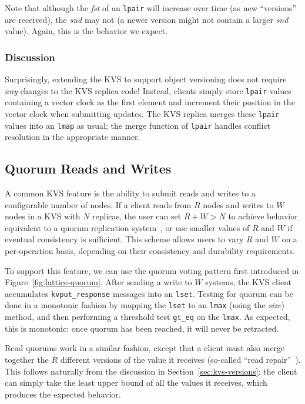 Note that although the \emph{fst} of an \texttt{lpair} will increase over time
(as new ``versions'' are received), the \emph{snd} may not (a newer version
might not contain a larger \emph{snd} value). Again, this is the behavior we
expect.

\subsubsection{Discussion}
Surprisingly, extending the KVS to support object versioning does not require
\emph{any} changes to the KVS replica code! Instead, clients simply store
\texttt{lpair} values containing a vector clock as the first element and
increment their position in the vector clock when submitting updates. The KVS
replica merges these \texttt{lpair} values into an \texttt{lmap} as usual; the
merge function of \texttt{lpair} handles conflict resolution in the appropriate
manner.

\subsection{Quorum Reads and Writes}
A common KVS feature is the ability to submit reads and writes to a configurable
number of nodes. If a client reads from $R$ nodes and writes to $W$ nodes in a
KVS with $N$ replicas, the user can set $R + W > N$ to achieve behavior
equivalent to a quorum replication system~\cite{Gifford1979}, or use smaller
values of $R$ and $W$ if eventual consistency is sufficient. This scheme allows
users to vary $R$ and $W$ on a per-operation basis, depending on their
consistency and durability requirements.

To support this feature, we can use the \lang quorum voting pattern first
introduced in Figure~\ref{fig:lattice-quorum}. After sending a write to $W$
systems, the KVS client accumulates \texttt{kvput\_response} messages into an
\texttt{lset}. Testing for quorum can be done in a monotonic fashion by mapping
the \texttt{lset} to an \texttt{lmax} (using the \emph{size}) method, and then
performing a threshold test \texttt{gt\_eq} on the \texttt{lmax}. As expected,
this is monotonic: once quorum has been reached, it will never be retracted.

Read quorums work in a similar fashion, except that a client must also merge
together the $R$ different versions of the value it receives (so-called ``read
repair''~\cite{DeCandia2007}). This follows naturally from the discussion in
Section~\ref{sec:kvs-versions}: the client can simply take the least upper bound
of all the values it receives, which produces the expected behavior.
